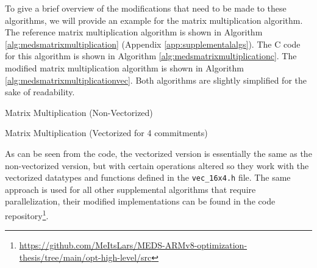 \documentclass[11pt,a4paper]{report}
\theoremstyle{definition}
\begin{document}
To give a brief overview of the modifications that need to be made to these algorithms, we will provide an example for the matrix multiplication algorithm. The reference matrix multiplication algorithm is shown in Algorithm \ref{alg:medsmatrixmultiplication} (Appendix \ref{app:supplementalalgs}). The C code for this algorithm is shown in Algorithm \ref{alg:medsmatrixmultiplicationc}. The modified matrix multiplication algorithm is shown in Algorithm \ref{alg:medsmatrixmultiplicationvec}. Both algorithms are slightly simplified for the sake of readability.

\begin{algorithm}
  \caption{Matrix Multiplication (Non-Vectorized)}
  \label{alg:medsmatrixmultiplicationc}
  
\end{algorithm}

\begin{algorithm}
  \caption{Matrix Multiplication (Vectorized for 4 commitments)}
  \label{alg:medsmatrixmultiplicationvec}
  
\end{algorithm}

As can be seen from the code, the vectorized version is essentially the same as the non-vectorized version, but with certain operations altered so they work with the vectorized datatypes and functions defined in the \texttt{vec\_16x4.h} file. The same approach is used for all other supplemental algorithms that require parallelization, their modified implementations can be found in the code repository\footnote{\url{https://github.com/MeItsLars/MEDS-ARMv8-optimization-thesis/tree/main/opt-high-level/src}}.
\end{document}
